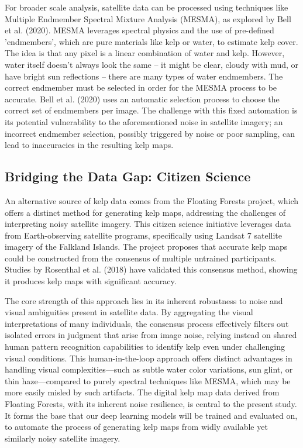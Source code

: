 \documentclass{article}
\begin{document}
For broader scale analysis, satellite data can be processed using techniques like Multiple Endmember Spectral Mixture Analysis (MESMA), as explored by Bell et al. (2020). MESMA leverages spectral physics and the use of pre-defined 'endmembers', which are pure materials like kelp or water, to estimate kelp cover. The idea is that any pixel is a linear combination of water and kelp. However, water itself doesn't always look the same – it might be clear, cloudy with mud, or have bright sun reflections – there are many types of water endmembers. The correct endmember must be selected in order for the MESMA process to be accurate. Bell et al. (2020) uses an automatic selection process to choose the correct set of endmembers per image. The challenge with this fixed automation is its potential vulnerability to the aforementioned noise in satellite imagery; an incorrect endmember selection, possibly triggered by noise or poor sampling, can lead to inaccuracies in the resulting kelp maps.

\subsection{Bridging the Data Gap: Citizen Science} 

An alternative source of kelp data comes from the Floating Forests project, which offers a distinct method for generating kelp maps, addressing the challenges of interpreting noisy satellite imagery. This citizen science initiative leverages data from Earth-observing satellite programs, specifically using Landsat 7 satellite imagery of the Falkland Islands. The project proposes that accurate kelp maps could be constructed from the consensus of multiple untrained participants. Studies by Rosenthal et al. (2018) have validated this consensus method, showing it produces kelp maps with significant accuracy. 
        
The core strength of this approach lies in its inherent robustness to noise and visual ambiguities present in satellite data. By aggregating the visual interpretations of many individuals, the consensus process effectively filters out isolated errors in judgment that arise from image noise, relying instead on shared human pattern recognition capabilities to identify kelp even under challenging visual conditions. This human-in-the-loop approach offers distinct advantages in handling visual complexities—such as subtle water color variations, sun glint, or thin haze—compared to purely spectral techniques like MESMA, which may be more easily misled by such artifacts. The digital kelp map data derived from Floating Forests, with its inherent noise resilience, is central to the present study. It forms the base that our deep learning models will be trained and evaluated on, to automate the process of generating kelp maps from widly available yet similarly noisy satellite imagery.
\end{document}
